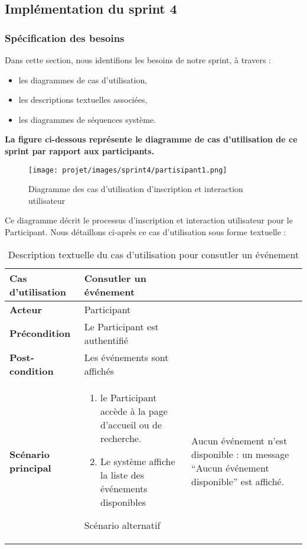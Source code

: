 \subsection{Implémentation du sprint 4}
\subsubsection{Spécification des besoins}
Dans cette section, nous identifions les besoins de notre  sprint, à travers :
\begin{itemize}
    \item les diagrammes de cas d’utilisation,
    \item les descriptions textuelles associées,
    \item les diagrammes de séquences système.
\end{itemize}

\textbf {La figure ci-dessous représente le diagramme de cas d’utilisation de ce sprint par rapport aux participants.}
\begin{figure}[H]
    \centering
    \texttt{[image: projet/images/sprint4/partisipant1.png]}
    \caption{Diagramme des cas d’utilisation d'inscription et interaction utilisateur }
    \label{fig:Adminee }
\end{figure}
\clearpage
Ce diagramme décrit le processus d'inscription et interaction utilisateur pour le Participant. Nous détaillons ci-après ce cas d’utilisation sous forme textuelle :

\begin{longtable}{|>{\bfseries}p{4cm}|p{10cm}|}
\hline
Cas d’utilisation & Consutler un événement \\
\hline
Acteur & Participant \\
\hline
Précondition & Le Participant est authentifié \\
\hline
Post-condition & Les événements sont affichés \\
\hline
Scénario principal & 
\begin{enumerate}
  \item le Participant accède à la page d’accueil ou de recherche.
  \item  Le système affiche la liste des événements disponibles
\end{enumerate} 
\hline
Scénario alternatif &  Aucun événement n’est disponible : un message “Aucun événement disponible” est affiché.
\hline
\caption{Description textuelle du cas d’utilisation pour consutler  un événement}
\end{longtable}


